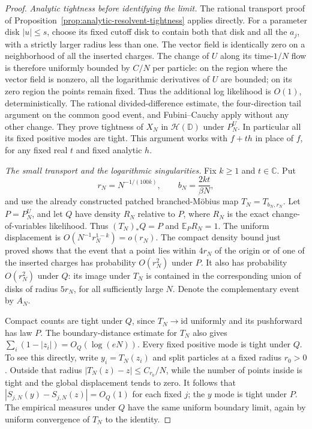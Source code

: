 \documentclass[11pt,a4paper]{article}
\numberwithin{equation}{section}
\theoremstyle{definition}
\theoremstyle{remark}
\newcommand{\D}{\mathbb D}
\newcommand{\C}{\mathbb C}
\begin{document}
\begin{proof}
\emph{Analytic tightness before identifying the limit.}
The rational transport proof of
Proposition~\ref{prop:analytic-resolvent-tightness} applies directly.
For a parameter disk $|u|\leq s$, choose its fixed cutoff disk to contain
both that disk and all the $a_j$, with a strictly larger radius less
than one. The vector field is identically zero on a neighborhood of
all the inserted charges. The change of $U$ along its time-$1/N$ flow
is therefore uniformly bounded by $C/N$ per particle: on the region
where the vector field is nonzero, all the logarithmic derivatives of
$U$ are bounded; on its zero region the points remain fixed.
Thus the additional log likelihood is $O(1)$, deterministically.
The rational divided-difference estimate, the four-direction tail
argument on the common good event, and Fubini--Cauchy apply without
any other change. They prove tightness of $X_N$ in $\mathcal H(\D)$
under $P_N^U$. In particular all its fixed positive modes are tight.
This argument works with $f+th$ in place of $f$, for any fixed real $t$
and fixed analytic $h$.

\emph{The small transport and the logarithmic singularities.}
Fix $k\geq1$ and $t\in\C$. Put
\[
 r_N=N^{-1/(100k)},\qquad b_N=\frac{2kt}{\beta N},
\]
and use the already constructed patched branched-M\"obius map
$T_N=T_{b_N,r_N}$. Let $P=P_N^U$, and let $Q$ have density $R_N$
relative to $P$, where $R_N$ is the exact change-of-variables likelihood.
Thus $(T_N)_*Q=P$ and $\mathbb E_PR_N=1$.
The uniform displacement is $O(N^{-1}r_N^{1-k})=o(r_N)$.
The compact density bound just proved shows that the event that a point
lies within $4r_N$ of the origin or of one of the inserted charges has
probability $O(r_N^2)$ under $P$. It also has probability $O(r_N^2)$
under $Q$: its image under $T_N$ is contained in the corresponding
union of disks of radius $5r_N$, for all sufficiently large $N$.
Denote the complementary event by $A_N$.

Compact counts are tight under $Q$, since $T_N\to\mathrm{id}$ uniformly
and its pushforward has law $P$. The boundary-distance estimate for
$T_N$ also gives
$\sum_i(1-|z_i|)=O_Q(\log(eN))$.
Every fixed positive mode is tight under $Q$. To see this directly,
write $y_i=T_N(z_i)$ and split particles at a fixed radius $r_0>0$.
Outside that radius $|T_N(z)-z|\leq C_{r_0}/N$, while the number of
points inside is tight and the global displacement tends to zero.
It follows that $|S_{j,N}(y)-S_{j,N}(z)|=O_Q(1)$ for each fixed $j$;
the $y$ mode is tight under $P$.
The empirical measures under $Q$ have the same uniform boundary limit,
again by uniform convergence of $T_N$ to the identity.


\end{proof}
\end{document}
